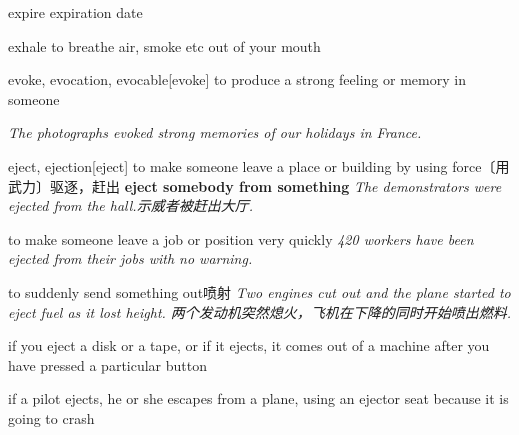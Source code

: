 \begin{DefWord}{expire}
    expiration date
\end{DefWord}

\begin{DefWord}{exhale}
    to breathe air, smoke etc out of your mouth
\end{DefWord}

\begin{DefWord}{evoke, evocation, evocable}[evoke]
    to produce a strong feeling or memory in someone

    \textit{The photographs evoked strong memories of our holidays in France.}

\end{DefWord}

\begin{DefWord}{eject, ejection}[eject]
    to make someone leave a place or building by using force〔用武力〕驱逐，赶出
    \textbf{eject somebody from something}
    \textit{The demonstrators were ejected from the hall.示威者被赶出大厅. }

    to make someone leave a job or position very quickly
    \textit{420 workers have been ejected from their jobs with no warning.}

    to suddenly send something out喷射
    \textit{Two engines cut out and the plane started to eject fuel as it lost height. 两个发动机突然熄火，飞机在下降的同时开始喷出燃料. }

    if you eject a disk or a tape, or if it ejects, it comes out of a machine after you have pressed a particular button

    if a pilot ejects, he or she escapes from a plane, using an ejector seat because it is going to crash
\end{DefWord}